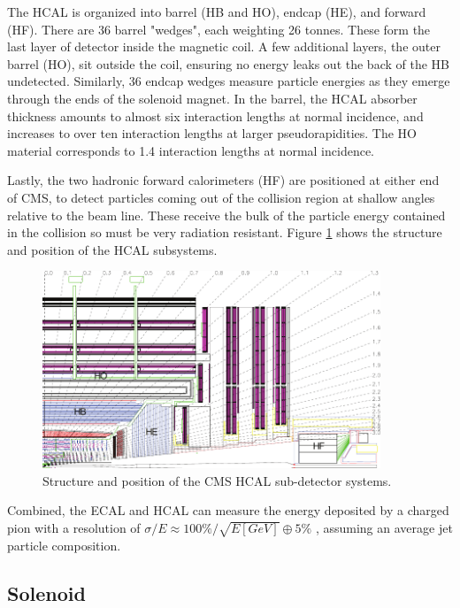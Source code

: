  The HCAL is organized into barrel (HB and HO), endcap (HE), and forward (HF). There are 36 barrel "wedges", each weighting 26 tonnes. These form the last layer of detector inside the magnetic coil. A few additional layers, the outer barrel (HO), sit outside the coil, ensuring no energy leaks out the back of the HB undetected. Similarly, 36 endcap wedges measure particle energies as they emerge through the ends of the solenoid magnet. In the barrel, the HCAL absorber thickness amounts to almost six interaction lengths at normal incidence, and increases to over ten interaction lengths at larger pseudorapidities. The HO material corresponds to 1.4 interaction lengths at normal incidence.

 Lastly, the two hadronic forward calorimeters (HF) are positioned at either end of CMS, to detect particles coming out of the collision region at shallow angles relative to the beam line. These receive the bulk of the particle energy contained in the collision so must be very radiation resistant. Figure \ref{fig:cmshcal} shows the structure and position of the HCAL subsystems. 

     \begin{figure}[h]
 	\centering
 	\includegraphics[width=0.9\textwidth]{figures/HCAL_subdet.pdf}
 	\singlespace
 	\caption{Structure and position of the CMS HCAL sub-detector systems.}
 	\label{fig:cmshcal}
	 \end{figure}

Combined, the ECAL and HCAL can measure the energy deposited by a charged pion with a resolution of $\sigma/E\approx100\%/\sqrt{E[GeV]}\oplus5\%$ \cite{Yazgan_2009}, assuming an average jet particle composition.

 \subsection{Solenoid}

